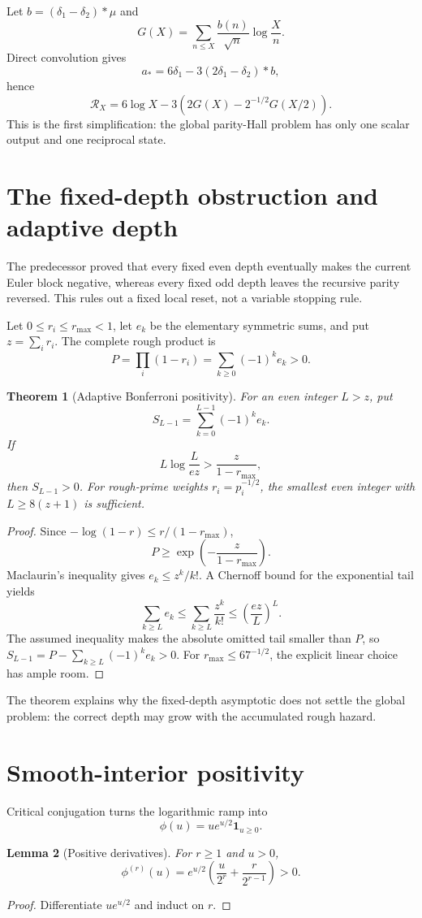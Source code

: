 \documentclass[11pt]{article}
\newtheorem{theorem}{Theorem}[section]
\newtheorem{lemma}[theorem]{Lemma}
\newcommand{\1}{\mathbf 1}
\newcommand{\RR}{\mathcal R}
\begin{document}
Let \(b=(\delta_1-\delta_2)*\mu\) and
\[
G(X)=\sum_{n\le X}\frac{b(n)}{\sqrt n}\log\frac Xn.
\]
Direct convolution gives
\[
a_*=6\delta_1-3(2\delta_1-\delta_2)*b,
\]
hence
\begin{equation}\label{eq:recip}
\RR_X=6\log X-3\left(2G(X)-2^{-1/2}G(X/2)\right).
\end{equation}
This is the first simplification: the global parity-Hall problem has only one
scalar output and one reciprocal state.

\section{The fixed-depth obstruction and adaptive depth}
The predecessor proved that every fixed even depth eventually makes the current
Euler block negative, whereas every fixed odd depth leaves the recursive parity
reversed. This rules out a fixed local reset, not a variable stopping rule.

Let \(0\le r_i\le r_{\max}<1\), let \(e_k\) be the elementary symmetric sums,
and put \(z=\sum_i r_i\). The complete rough product is
\[
P=\prod_i(1-r_i)=\sum_{k\ge0}(-1)^ke_k>0.
\]

\begin{theorem}[Adaptive Bonferroni positivity]\label{thm:bonf}
For an even integer \(L>z\), put
\[
S_{L-1}=\sum_{k=0}^{L-1}(-1)^ke_k.
\]
If
\[
L\log\frac{L}{ez}>\frac{z}{1-r_{\max}},
\]
then \(S_{L-1}>0\). For rough-prime weights \(r_i=p_i^{-1/2}\), the smallest
even integer with \(L\ge8(z+1)\) is sufficient.
\end{theorem}
\begin{proof}
Since \(-\log(1-r)\le r/(1-r_{\max})\),
\[
P\ge \exp\left(-\frac{z}{1-r_{\max}}\right).
\]
Maclaurin's inequality gives \(e_k\le z^k/k!\). A Chernoff bound for the
exponential tail yields
\[
\sum_{k\ge L}e_k\le \sum_{k\ge L}\frac{z^k}{k!}
\le\left(\frac{ez}{L}\right)^L.
\]
The assumed inequality makes the absolute omitted tail smaller than \(P\), so
\(S_{L-1}=P-\sum_{k\ge L}(-1)^ke_k>0\). For
\(r_{\max}\le67^{-1/2}\), the explicit linear choice has ample room.
\end{proof}

The theorem explains why the fixed-depth asymptotic does not settle the global
problem: the correct depth may grow with the accumulated rough hazard.

\section{Smooth-interior positivity}
Critical conjugation turns the logarithmic ramp into
\[
\phi(u)=u e^{u/2}\1_{u\ge0}.
\]
\begin{lemma}[Positive derivatives]\label{lem:der}
For \(r\ge1\) and \(u>0\),
\[
\phi^{(r)}(u)=e^{u/2}\left(\frac{u}{2^r}+\frac{r}{2^{r-1}}\right)>0.
\]
\end{lemma}
\begin{proof}
Differentiate \(u e^{u/2}\) and induct on \(r\).
\end{proof}
\end{document}
